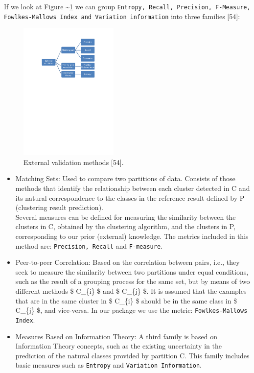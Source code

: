 \documentclass[
]{article}
\begin{document}
If we look at Figure \textasciitilde{}\ref{external} we can group
\texttt{Entropy, Recall, Precision, F-Measure, Fowlkes-Mallows Index and Variation information}
into three families {[}54{]}:

\begin{figure}
\centering
\includegraphics[width=\textwidth,height=2.70833in]{img/external.pdf}
\caption{External validation methods {[}54{]}. \label{external}}
\end{figure}

\begin{itemize}
\item
  Matching Sets: Used to compare two partitions of data. Consists of
  those methods that identify the relationship between each cluster
  detected in C and its natural correspondence to the classes in the
  reference result defined by P (clustering result prediction).\\
  Several measures can be defined for measuring the similarity between
  the clusters in C, obtained by the clustering algorithm, and the
  clusters in P, corresponding to our prior (external) knowledge. The
  metrics included in this method are: \texttt{Precision, Recall} and
  \texttt{F-measure}.
\item
  Peer-to-peer Correlation: Based on the correlation between pairs,
  i.e., they seek to measure the similarity between two partitions under
  equal conditions, such as the result of a grouping process for the
  same set, but by means of two different methods \$ C\_\{i\} \$ and \$
  C\_\{j\} \$. It is assumed that the examples that are in the same
  cluster in \$ C\_\{i\} \$ should be in the same class in \$ C\_\{j\}
  \$, and vice-versa. In our package we use the metric:
  \texttt{Fowlkes-Mallows Index}.
\item
  Measures Based on Information Theory: A third family is based on
  Information Theory concepts, such as the existing uncertainty in the
  prediction of the natural classes provided by partition C. This family
  includes basic measures such as \texttt{Entropy} and
  \texttt{Variation Information}.
\end{itemize}
\end{document}
